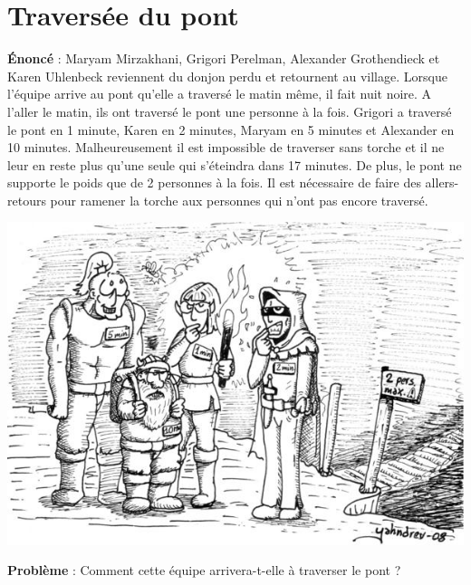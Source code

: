 \documentclass{article}
\begin{document}
 
\section{Traversée du pont }

\textbf{Énoncé} : Maryam Mirzakhani, Grigori Perelman, Alexander Grothendieck et Karen Uhlenbeck reviennent du donjon perdu et retournent au village. Lorsque l'équipe arrive au pont qu'elle a traversé le matin même, il fait nuit noire. A l'aller le matin, ils ont traversé le pont une personne à la fois. Grigori a traversé le pont en 1 minute, Karen en 2 minutes, Maryam en 5 minutes et Alexander en 10 minutes. Malheureusement il est impossible de traverser sans torche et il ne leur en reste plus qu'une seule qui s'éteindra dans 17 minutes. De plus, le pont ne supporte le poids que de 2 personnes à la fois. Il est nécessaire de faire des allers-retours pour ramener la torche aux personnes qui n'ont pas encore traversé. \\

\begin{center}
	\includegraphics[scale=1.25]{Figures/traverser} 
\end{center}

\textbf{Problème }: Comment cette équipe arrivera-t-elle à traverser le pont ? \\   
   
  
 
  
  
\end{document}
